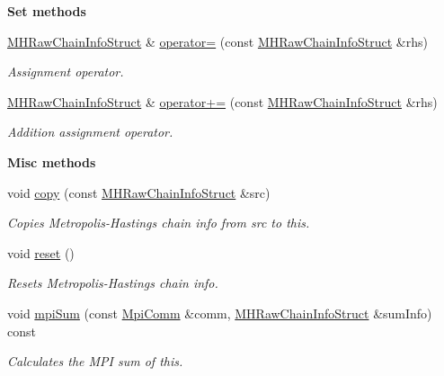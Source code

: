 \begin{Indent}{\bf Set methods}\par
\begin{DoxyCompactItemize}
\item 
\hyperlink{struct_q_u_e_s_o_1_1_m_h_raw_chain_info_struct}{M\-H\-Raw\-Chain\-Info\-Struct} \& \hyperlink{struct_q_u_e_s_o_1_1_m_h_raw_chain_info_struct_ad5caeca2e570614d2198339d3f4ebd59}{operator=} (const \hyperlink{struct_q_u_e_s_o_1_1_m_h_raw_chain_info_struct}{M\-H\-Raw\-Chain\-Info\-Struct} \&rhs)
\begin{DoxyCompactList}\small\item\em Assignment operator. \end{DoxyCompactList}\item 
\hyperlink{struct_q_u_e_s_o_1_1_m_h_raw_chain_info_struct}{M\-H\-Raw\-Chain\-Info\-Struct} \& \hyperlink{struct_q_u_e_s_o_1_1_m_h_raw_chain_info_struct_aa4b3a01108cfac9339f570cafdc49b9b}{operator+=} (const \hyperlink{struct_q_u_e_s_o_1_1_m_h_raw_chain_info_struct}{M\-H\-Raw\-Chain\-Info\-Struct} \&rhs)
\begin{DoxyCompactList}\small\item\em Addition assignment operator. \end{DoxyCompactList}\end{DoxyCompactItemize}
\end{Indent}
\begin{Indent}{\bf Misc methods}\par
\begin{DoxyCompactItemize}
\item 
void \hyperlink{struct_q_u_e_s_o_1_1_m_h_raw_chain_info_struct_a347eb07ae3332d99813868ecb5b89682}{copy} (const \hyperlink{struct_q_u_e_s_o_1_1_m_h_raw_chain_info_struct}{M\-H\-Raw\-Chain\-Info\-Struct} \&src)
\begin{DoxyCompactList}\small\item\em Copies Metropolis-\/\-Hastings chain info from {\ttfamily src} to {\ttfamily this}. \end{DoxyCompactList}\item 
void \hyperlink{struct_q_u_e_s_o_1_1_m_h_raw_chain_info_struct_a366d78d7309ff99039bf005716ca18aa}{reset} ()
\begin{DoxyCompactList}\small\item\em Resets Metropolis-\/\-Hastings chain info. \end{DoxyCompactList}\item 
void \hyperlink{struct_q_u_e_s_o_1_1_m_h_raw_chain_info_struct_a3a5132c9f3ea015518a0b2791659c9d1}{mpi\-Sum} (const \hyperlink{class_q_u_e_s_o_1_1_mpi_comm}{Mpi\-Comm} \&comm, \hyperlink{struct_q_u_e_s_o_1_1_m_h_raw_chain_info_struct}{M\-H\-Raw\-Chain\-Info\-Struct} \&sum\-Info) const 
\begin{DoxyCompactList}\small\item\em Calculates the M\-P\-I sum of {\ttfamily this}. \end{DoxyCompactList}\end{DoxyCompactItemize}
\end{Indent}
